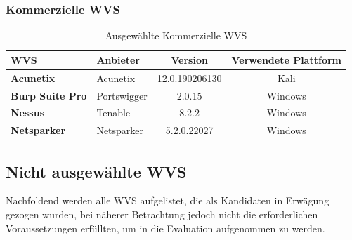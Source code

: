 \documentclass[12pt,oneside,a4paper,parskip]{scrbook}
\begin{document}
    \subsubsection{Kommerzielle WVS}
      \begin{table}[H]
        \centering
          \begin{tabular}{|p{4cm}|l|c|c|}
            \hline
            \textbf{WVS}            & \textbf{Anbieter} & \textbf{Version} & \textbf{Verwendete Plattform}  \\
            \hline
            \textbf{Acunetix}       & Acunetix          & 12.0.190206130   & Kali                          \\
            \hline
            \textbf{Burp Suite Pro} & Portswigger       & 2.0.15           & Windows                       \\
            \hline
            \textbf{Nessus}         & Tenable           & 8.2.2            & Windows                       \\
            \hline
            \textbf{Netsparker}     & Netsparker        & 5.2.0.22027      & Windows                       \\
            \hline
          \end{tabular}
        \caption[Ausgewählte Kommerzielle WVS]{Ausgewählte Kommerzielle WVS}
      \end{table}

  \subsection{Nicht ausgewählte WVS}
    Nachfoldend werden alle WVS aufgelistet, die als Kandidaten in Erwägung gezogen wurden, bei näherer Betrachtung jedoch nicht die erforderlichen Voraussetzungen erfüllten, um in die Evaluation aufgenommen zu werden.
\end{document}
